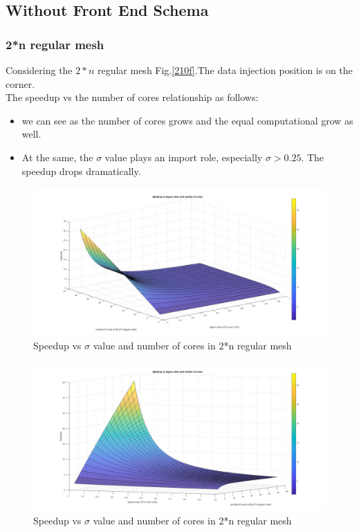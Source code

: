\subsection{Without Front End Schema}

\subsubsection{2*n regular mesh}
Considering the $2*n $ regular mesh Fig.\ref{210f}.The data injection position is on the corner.
\\
\vspace*{15pt}
The speedup vs the number of cores relationship as follows:

\begin{itemize}
\item we can see as the number of cores grows and the equal computational grow as well. 
\item At the same, the $\sigma$ value plays an import role, especially $\sigma > 0.25$. The speedup drops dramatically.
\end{itemize}


\begin{figure}[h]
\centering\includegraphics[width=0.85\linewidth]{figure/nocorner2n}
\caption{Speedup vs $\sigma$ value and number of cores in 2*n regular mesh}
\label{nocorner2n}
\end{figure}

\begin{figure}[h]
\centering\includegraphics[width=0.85\linewidth]{figure/nocorner2n2}
\caption{Speedup vs $\sigma$ value and number of cores in 2*n regular mesh}
\label{nocorner2n2}
\end{figure}

